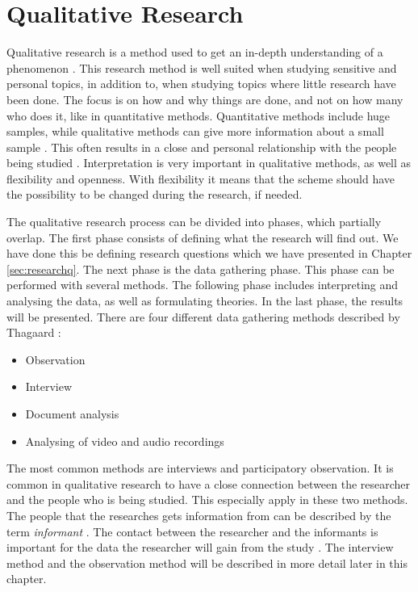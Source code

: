 \section{Qualitative Research}
\label{sec:qualitativeres}
Qualitative research is a method used to get an in-depth understanding of a phenomenon \cite{qualitative}. This research method is well suited when studying sensitive and personal topics, in addition to, when studying topics where little research have been done. The focus is on how and why things are done, and not on how many who does it, like in quantitative methods. Quantitative methods include huge samples, while qualitative methods can give more information about a small sample \cite{qualitative}. This often results in a close and personal relationship with the people being studied \cite{tjora}. Interpretation is very important in qualitative methods, as well as flexibility and openness. With flexibility it means that the scheme should have the possibility to be changed during the research, if needed. 

The qualitative research process can be divided into phases, which partially overlap. The first phase consists of defining what the research will find out. We have done this be defining research questions which we have presented in Chapter \ref{sec:researchq}. The next phase is the data gathering phase. This phase can be performed with several methods. The following phase includes interpreting and analysing the data, as well as formulating theories. In the last phase, the results will be presented. There are four different data gathering methods described by Thagaard \cite{qualitative}:

\begin{itemize}
\item Observation 
\item Interview  
\item Document analysis
\item Analysing of video and audio recordings
\end{itemize}

The most common methods are interviews and participatory observation. It is common in qualitative research to have a close connection between the researcher and the people who is being studied. This especially apply in these two methods. The people that the researches gets information from can be described by the term \emph{informant} \cite{qualitative}. The contact between the researcher and the informants is important for the data the researcher will gain from the study \cite{qualitative}. The interview method and the observation method will be described in more detail later in this chapter.

